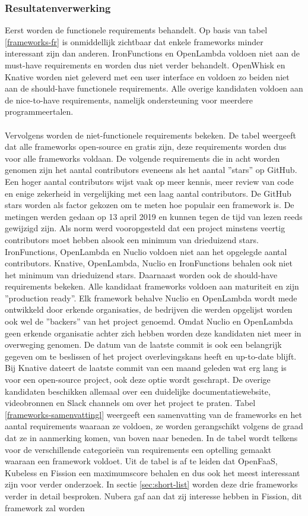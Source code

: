 \subsubsection{Resultatenverwerking}
Eerst worden de functionele requirements behandelt. Op basis van tabel \ref{frameworks-fr} is onmiddellijk zichtbaar dat enkele frameworks minder interessant zijn dan anderen. IronFunctions en OpenLambda voldoen niet aan de must-have requirements en worden dus niet verder behandelt. OpenWhisk en Knative worden niet geleverd met een user interface en voldoen zo beiden niet aan de should-have functionele requirements. Alle overige kandidaten voldoen aan de nice-to-have requirements, namelijk ondersteuning voor meerdere programmeertalen.
\\\\
Vervolgens worden de niet-functionele requirements bekeken. De tabel weergeeft dat alle frameworks open-source en gratis zijn, deze requirements worden dus voor alle frameworks voldaan. De volgende requirements die in acht worden genomen zijn het aantal contributors eveneens als het aantal ''stars'' op GitHub. Een hoger aantal contributors wijst vaak op meer kennis, meer review van code en enige zekerheid in vergelijking met een laag aantal contributors. De GitHub stars worden als factor gekozen om te meten hoe populair een framework is. De metingen werden gedaan op 13 april 2019 en kunnen tegen de tijd van lezen reeds gewijzigd zijn. Als norm werd vooropgesteld dat een project minstens veertig contributors moet hebben alsook een minimum van drieduizend stars. IronFunctions, OpenLambda en Nuclio voldoen niet aan het opgelegde aantal contributors. Knative, OpenLambda, Nuclio en IronFunctions behalen ook niet het minimum van drieduizend stars. Daarnaast worden ook de should-have requirements bekeken. Alle kandidaat frameworks voldoen aan maturiteit en zijn ''production ready''. Elk framework behalve Nuclio en OpenLambda wordt mede ontwikkeld door erkende organisaties, de bedrijven die werden opgelijst worden ook wel de ''backers'' van het project genoemd. Omdat Nuclio en OpenLambda geen erkende organisatie achter zich hebben worden deze kandidaten niet meer in overweging genomen. De datum van de laatste commit is ook een belangrijk gegeven om te beslissen of het project overlevingskans heeft en up-to-date blijft. Bij Knative dateert de laatste commit van een maand geleden wat erg lang is voor een open-source project, ook deze optie wordt geschrapt. De overige kandidaten beschikken allemaal over een duidelijke documentatiewebsite, videobronnen en Slack channels om over het project te praten. Tabel \ref{frameworks-samenvattingl} weergeeft een samenvatting van de frameworks en het aantal requirements waaraan ze voldoen, ze worden gerangschikt volgens de graad dat ze in aanmerking komen, van boven naar beneden. In de tabel wordt telkens voor de verschillende categorieën van requirements een optelling gemaakt waaraan een framework voldoet. Uit de tabel is af te leiden dat OpenFaaS, Kubeless en Fission een maximumscore behalen en dus ook het meest interessant zijn voor verder onderzoek. In sectie \ref{sec:short-list} worden deze drie frameworks verder in detail besproken. Nubera gaf aan dat zij interesse hebben in Fission, dit framework zal worden 